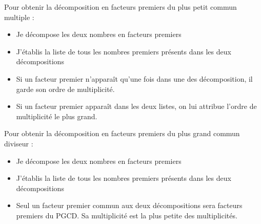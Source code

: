 \documentclass[main.tex]{subfiles}
\begin{document}
\begin{cBox}
	Pour obtenir la décomposition en facteurs premiers du plus petit commun multiple  :
	\begin{itemize}
		\item Je décompose les deux nombres en facteurs premiers
		\item J'établis la liste de tous les nombres premiers présents dans les deux décompositions
		\item Si un facteur premier n'apparaît qu'une fois dans une des décomposition, il garde son ordre de multiplicité.
		\item Si un facteur premier apparaît dans les deux listes, on lui attribue l'ordre de multiplicité le plus grand.
	\end{itemize}
\end{cBox}
\begin{cBox}
	Pour obtenir la décomposition en facteurs premiers du plus grand commun diviseur :
	\begin{itemize}
		\item Je décompose les deux nombres en facteurs premiers
		\item J'établis la liste de tous les nombres premiers présents dans les deux décompositions
		\item Seul un facteur premier commun aux deux décompositions sera facteurs premiers du PGCD. Sa multiplicité est la plus petite des multiplicités.
	\end{itemize}
\end{cBox}

%	 

\newpage 
\Tableau[Metre,  FlechesH, NbLignes=1] %
\Tableau[Gramme,FlechesH,  NbLignes=1] %
\Tableau[Carre, Colonnes, FlechesH,Are, NbLignes=4] %
\Tableau[Cube,Colonnes,FlechesH, Capacite, NbLignes=4] %

 
\clearpage
{}  
\pagestyle{plain.scrheadings} %
\doublespacing 
\end{document}
